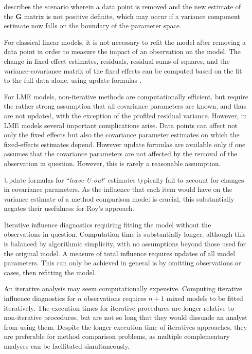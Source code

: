 \documentclass[12pt, a4paper]{report}
\theoremstyle{definition}
\theoremstyle{remark}
\begin{document}
\citet{schabenberger} describes the scenario wherein a data point is removed and the new estimate of the $\boldsymbol{G}$ matrix is not positive definite, which may occur if a variance component estimate now falls on the boundary of the parameter space. 

For classical linear models, it is not necessary to refit the model after removing a data point in order to measure the impact of an observation on the model. The change in fixed effect estimates, residuals, residual sums of squares, and the variance-covariance matrix of the fixed effects can be computed based on the fit to the full data alone, using update formulas \citep{sherman, hager1989}.

For LME models, non-iterative methods are computationally efficient, but require the rather strong assumption that all covariance parameters are known, and thus are not updated, with the exception of the profiled residual variance. However, in LME models several important complications arise. Data points can affect not only the fixed effects but also the covariance parameter estimates on which the fixed-effects estimates depend. However update formulas are available only if one assumes that the covariance parameters are not affected by the removal of the observation in question. However, this is rarely a reasonable assumption.


Update formulas for ``\textit{leave-U-out}" estimates typically fail to account for changes in covariance parameters. As the influence that each item would have on the variance estimate of a method comparison model is crucial, this substantially negates their usefulness for Roy's approach.

Iterative influence diagnostics requiring fitting the model without the observations in question. Computation time is substantially longer, although this is balanced by algorithmic simplicity, with no assumptions beyond those used for the original model. A measure of total influence requires updates of all model parameters. This can only be achieved in general is by omitting observations or cases, then refitting the model. 

An iterative analysis may seem computationally expensive. Computing iterative influence diagnostics for $n$ observations requires $n+1$ mixed models to be fitted iteratively. The execution times for iterative procedures are longer relative to non-iterative procedures, but are not so long that they would dissuade an analyst from using them. Despite the longer execution time of iteratives
approaches, they are preferable for method comparison problems, as multiple complementary analyses can be facilitated simultaneously. 
\end{document}
